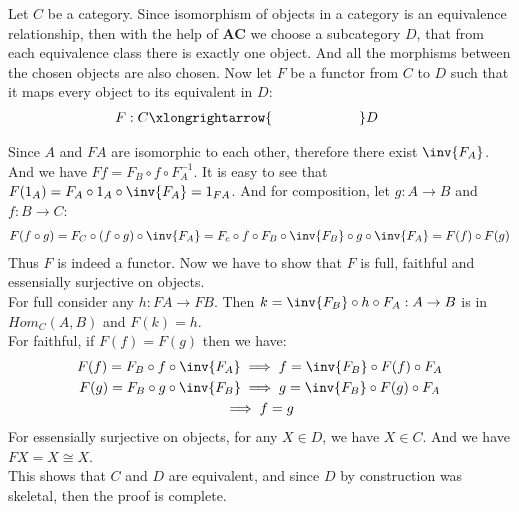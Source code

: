 Let $C$ be a category. Since isomorphism of objects in a category is an equivalence relationship, then with the help of \textbf{AC} we choose a subcategory $D$, that from each equivalence class there is exactly one object. And all the morphisms between the chosen objects are also chosen. Now let $F$ be a functor from $C$ to $D$ such that it maps every object to its equivalent in $D$:
\begin{gather*}
    F: C \xlongrightarrow{\hspace{2.2cm}} D \phantom{llllll}
\end{gather*}
\begin{center}
\end{center}
Since $A$ and $FA$ are isomorphic to each other, therefore there exist $\inv{F_A}$. And we have $Ff = F_B \circ f \circ F_A^{-1}$. It is easy to see that $F(1_A) = F_A \circ 1_A \circ \inv{F_A} = 1_{FA}$. And for composition, let $g: A \to B$ and $f: B \to C$:
\begin{gather*}
    F(f \circ g) = F_C \circ (f \circ g) \circ \inv{F_A} = F_c \circ f \circ F_B \circ \inv{F_B} \circ g \circ \inv{F_A} = F(f) \circ F(g)
\end{gather*}
Thus $F$ is indeed a functor. Now we have to show that $F$ is full, faithful and essensially surjective on objects. \\
For full consider any $h: FA \to FB$.
Then $k = \inv{F_B} \circ h \circ F_A: A \to B$ is in $Hom_C(A, B)$ and $F(k) = h$.\\
For faithful, if $F(f) = F(g)$ then we have:
\begin{gather*}
    F(f) = F_B \circ f \circ \inv{F_A} \implies f = \inv{F_B} \circ F(f) \circ F_A \\
    F(g) = F_B \circ g \circ \inv{F_B} \implies g = \inv{F_B} \circ F(g) \circ F_A \\
    \implies f = g
\end{gather*}
For essensially surjective on objects, for any $X \in D$, we have $X \in C$. And we have $FX = X \cong X$. \\
This shows that $C$ and $D$ are equivalent, and since $D$ by construction was skeletal, then the proof is complete.